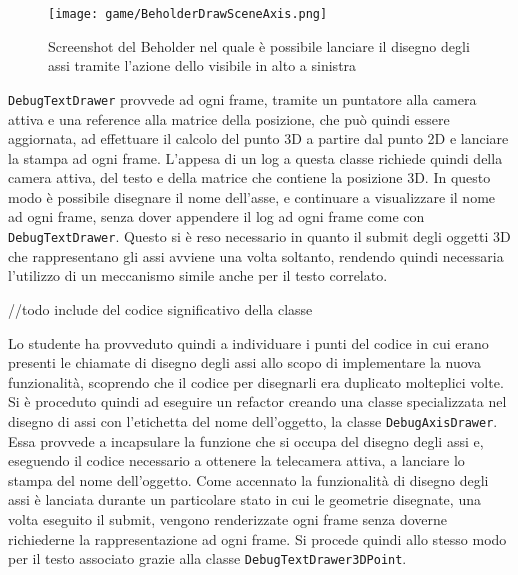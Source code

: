 \begin{figure}[h!] 
	\centering 
	\hspace*{-0.05\columnwidth}\texttt{[image: game/BeholderDrawSceneAxis.png]} 
	\caption{Screenshot del Beholder nel quale è possibile lanciare il disegno degli assi tramite l'azione  dello  visibile in alto a sinistra}
\end{figure}

\texttt{DebugTextDrawer} provvede ad ogni frame, tramite un puntatore alla camera attiva e una reference alla matrice della posizione, che può quindi essere aggiornata, ad effettuare il calcolo del punto 3D a partire dal punto 2D e lanciare la stampa ad ogni frame. L'appesa di un log a questa classe richiede quindi della camera attiva, del testo e della matrice che contiene la posizione 3D. In questo modo è possibile disegnare il nome dell'asse, e continuare a visualizzare il nome ad ogni frame, senza dover appendere il log ad ogni frame come con \texttt{DebugTextDrawer}. Questo si è reso necessario in quanto il submit degli oggetti 3D che rappresentano gli assi avviene una volta soltanto, rendendo quindi necessaria l'utilizzo di un meccanismo simile anche per il testo correlato.

//todo include del codice significativo della classe

Lo studente ha provveduto quindi a individuare i punti del codice in cui erano presenti le chiamate di disegno degli assi allo scopo di implementare la nuova funzionalità, scoprendo che il codice per disegnarli era duplicato molteplici volte.\\

Si è proceduto quindi ad eseguire un refactor creando una classe specializzata nel disegno di assi con l'etichetta del nome dell'oggetto, la classe \texttt{DebugAxisDrawer}.\\

Essa provvede a incapsulare la funzione che si occupa del disegno degli assi e, eseguendo il codice necessario a ottenere la telecamera attiva, a lanciare lo stampa del nome dell'oggetto. Come accennato la funzionalità di disegno degli assi è lanciata durante un particolare stato in cui le geometrie disegnate, una volta eseguito il submit, vengono renderizzate ogni frame senza doverne richiederne la rappresentazione ad ogni frame. Si procede quindi allo stesso modo per il testo associato grazie alla classe \texttt{DebugTextDrawer3DPoint}.\\

